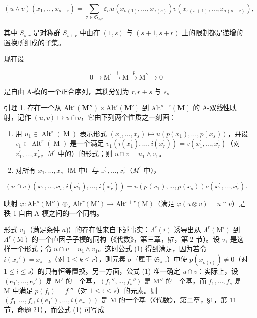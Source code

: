 \[
(u \wedge v) (x _ {1}, \dots , x _ {s + r}) = \sum_ {\sigma \in \mathfrak {S} _ {s, r}} \varepsilon_ {\sigma} u (x _ {\sigma (1)}, \dots , x _ {\sigma (s)}) v (x _ {\sigma (s + 1)}, \dots , x _ {\sigma (s + r)}),
\]

其中 \(S_{s,r}\) 是对称群 \(S_{s+r}\) 中由在 \((1,s)\) 与 \((s+1,s+r)\) 上的限制都是递增的置换所组成的子集。

现在设

\[
0 \longrightarrow \mathrm{M} ^ {\prime} \stackrel {i} {\longrightarrow} \mathrm{M} \stackrel {p} {\longrightarrow} \mathrm{M} ^ {\prime \prime} \longrightarrow 0
\]

是自由 A-模的一个正合序列，其秩分别为 \(r, r + s\) 与 \(s\)。

引理 1. 存在一个从 \(\mathrm{Alt}^s (\mathbf{M}'')\times \mathrm{Alt}^r (\mathbf{M}')\) 到 \(\mathrm{Alt}^{s + r}(\mathbf{M})\) 的 A-双线性映射，记作 \((u,v)\mapsto u\cap v\)，它由下列两个性质之一刻画：

\begin{enumerate}
\def\labelenumi{\alph{enumi})}
\item
  用 \(u_{1} \in \operatorname{Alt}^{s}(\operatorname{M})\) 表示形式 \((x_{1}, \ldots, x_{s}) \mapsto u(p(x_{1}), \ldots, p(x_{s}))\)，并设 \(v_{1} \in \operatorname{Alt}^{r}(\operatorname{M})\) 是一个满足 \(v_{1}(i(x_{1}^{\prime}), \ldots, i(x_{r}^{\prime})) = v(x_{1}^{\prime}, \ldots, x_{r}^{\prime})\)（对 \(x_{1}^{\prime}, \ldots, x_{r}^{\prime}\)，\(M^{\prime}\) 中的）的形式；则 \(u \cap v = u_{1} \wedge v_{1}\)。
\item
  对所有 \(x_{1},\ldots,x_{s}\)（M 中）与 \(x_{1}^{\prime},\ldots,x_{r}^{\prime}\)（\(M^{\prime}\) 中），
\end{enumerate}

\[
(u \cap v) (x _ {1}, \dots , x _ {s}, i (x _ {1} ^ {\prime}), \dots , i (x _ {r} ^ {\prime})) = u (p (x _ {1}), \dots , p (x _ {s})) v (x _ {1} ^ {\prime}, \dots , x _ {r} ^ {\prime}).\tag{1}
\]

映射 \(\varphi : \mathrm{Alt}^s (\mathrm{M}'')\otimes_{\mathrm{A}}\mathrm{Alt}^r (\mathrm{M}')\to \mathrm{Alt}^{s + r}(\mathrm{M})\)（满足 \(\varphi (u\otimes v) = u\cap v\)）是秩 1 自由 A-模之间的一个同构。

形式 \(v_{1}\)（满足条件 \(a\))）的存在性来自下述事实：\(\Lambda^r (i)\) 诱导出从 \(\Lambda^r (\mathrm{M}')\) 到 \(\Lambda^r (\mathrm{M})\) 的一个直因子子模的同构（《代数》，第三章，§7，第 2 节）。设 \(v_{1}\) 是这样一个形式；令 \(u\cap v = u_{1}\wedge v_{1}\)。这时公式 (1) 得到满足，因为若令 \(i(x_k') = x_{s + k}\)（对 \(1\leq k\leq r\)），则元素 \(\sigma\)（属于 \(\mathfrak{S}_{s,r}\)）中使 \(p(x_{\sigma (i)})\neq 0\)（对 \(1\leq i\leq s\)）的只有恒等置换。另一方面，公式 (1) 唯一确定 \(u\cap v\)：实际上，设 \((e_1',\ldots ,e_r')\) 是 \(\mathrm{M}'\) 的一个基，\((f_1'',\dots,f_s'')\) 是 \(\mathrm{M}''\) 的一个基，而 \(f_{1},\ldots ,f_{s}\) 是 \(\mathrm{M}\) 中满足 \(p(f_i) = f_i''\)（对 \(1\leq i\leq s\)）的元素。则 \((f_{1},\ldots ,f_{s},i(e_1'),\ldots ,i(e_r'))\) 是 \(\mathrm{M}\) 的一个基（《代数》，第二章，§1，第 11 节，命题 21），而公式 (1) 可写成


